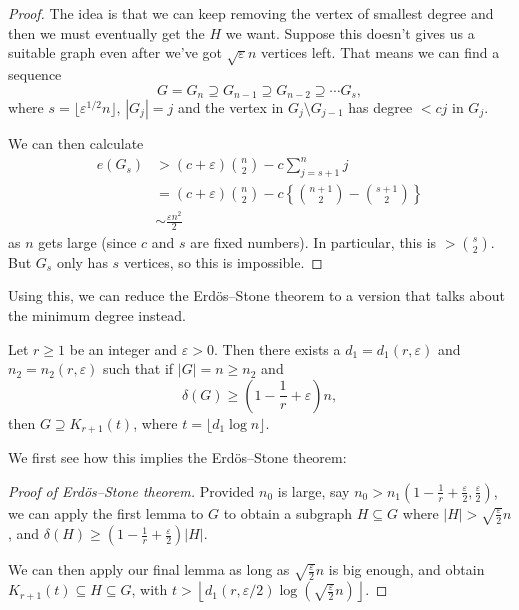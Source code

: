 \documentclass[a4paper]{article}
\begin{document}
\begin{proof}
  The idea is that we can keep removing the vertex of smallest degree and then we must eventually get the $H$ we want. Suppose this doesn't gives us a suitable graph even after we've got $\sqrt{\varepsilon}n$ vertices left. That means we can find a sequence
  \[
    G = G_n \supseteq G_{n - 1} \supseteq G_{n - 2} \supseteq \cdots G_s,
  \]
  where $s = \lfloor \varepsilon^{1/2}n \rfloor$, $|G_j| = j$ and the vertex in $G_j \setminus G_{j - 1}$ has degree $< cj$ in $G_j$.

  We can then calculate
  \begin{align*}
    e(G_s) &> (c + \varepsilon) \binom{n}{2} - c \sum_{j = s + 1}^n j \\
    &= (c + \varepsilon) \binom{n}{2} - c \left\{\binom{n+1}{2} - \binom{s + 1}{2}\right\} \\
    &\sim \frac{\varepsilon n^2}{2}
  \end{align*}
  as $n$ gets large (since $c$ and $s$ are fixed numbers). In particular, this is $> \binom{s}{2}$. But $G_s$ only has $s$ vertices, so this is impossible.
\end{proof}

Using this, we can reduce the Erd\"os--Stone theorem to a version that talks about the minimum degree instead.
\begin{lemma}
  Let $r \geq 1$ be an integer and $\varepsilon > 0$. Then there exists a $d_1 = d_1(r, \varepsilon)$ and $n_2 = n_2(r, \varepsilon)$ such that if $|G| = n \geq n_2$ and
  \[
    \delta(G) \geq \left(1 - \frac{1}{r} + \varepsilon\right)n,
  \]
  then $G \supseteq K_{r + 1}(t)$, where $t = \lfloor d_1 \log n\rfloor$.
\end{lemma}
We first see how this implies the Erd\"os--Stone theorem:

\begin{proof}[Proof of Erd\"os--Stone theorem]
  Provided $n_0$ is large, say $n_0 > n_1\left(1 - \frac{1}{r} + \frac{\varepsilon}{2}, \frac{\varepsilon}{2}\right)$, we can apply the first lemma to $G$ to obtain a subgraph $H \subseteq G$ where $|H| > \sqrt{\frac{\varepsilon}{2}} n$, and $\delta(H) \geq \left(1 - \frac{1}{r} + \frac{\varepsilon}{2}\right) |H|$.

  We can then apply our final lemma as long as $\sqrt{\frac{\varepsilon}{2}} n$ is big enough, and obtain $K_{r + 1}(t) \subseteq H \subseteq G$, with $t > \left\lfloor d_1(r, \varepsilon/2) \log \left(\sqrt{\frac{\varepsilon}{2}} n\right)\right\rfloor$.
\end{proof}
\end{document}
